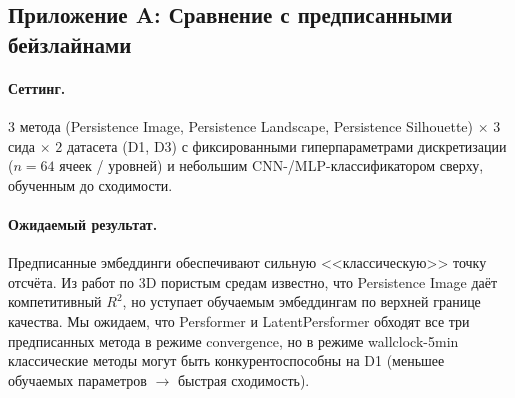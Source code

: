 \subsection{Приложение A: Сравнение с предписанными бейзлайнами}
\label{ssec:exp-classical}

\paragraph{Сеттинг.} $3$ метода (Persistence Image, Persistence Landscape, Persistence Silhouette) $\times$ $3$ сида $\times$ $2$ датасета (D1, D3) с фиксированными гиперпараметрами дискретизации ($n=64$ ячеек / уровней) и небольшим CNN-/MLP-классификатором сверху, обученным до сходимости.

\paragraph{Ожидаемый результат.} Предписанные эмбеддинги обеспечивают сильную <<классическую>> точку отсчёта. Из работ по 3D пористым средам известно, что Persistence Image даёт компетитивный $R^2$, но уступает обучаемым эмбеддингам по верхней границе качества. Мы ожидаем, что Persformer и LatentPersformer обходят все три предписанных метода в режиме convergence, но в режиме wallclock-5min классические методы могут быть конкурентоспособны на D1 (меньшее обучаемых параметров $\to$ быстрая сходимость).

\begin{table}[ht]
\centering
{}
\caption{Предписанные эмбеддинги: расширение основной таблицы для приложения.}
\label{tab:classical}
\end{table}
